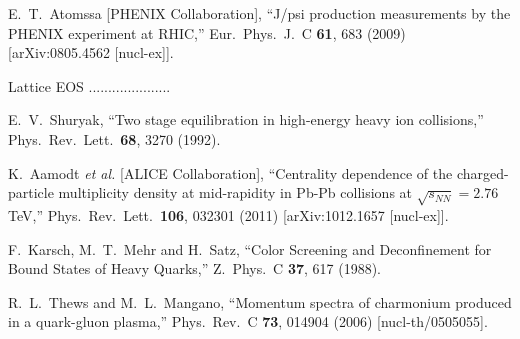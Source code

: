 \documentclass[aps,prc,preprint,superscriptaddress,showpacs,showkeys]{revtex4-1}
\begin{document}
\begin{thebibliography}{100}
  E.~T.~Atomssa [PHENIX Collaboration],
  ``J/psi production measurements by the PHENIX experiment at RHIC,''
  Eur.\ Phys.\ J.\ C {\bf 61}, 683 (2009)
  [arXiv:0805.4562 [nucl-ex]].

 Lattice EOS .....................


  E.~V.~Shuryak,
  ``Two stage equilibration in high-energy heavy ion collisions,''
  Phys.\ Rev.\ Lett.\  {\bf 68}, 3270 (1992).





  K.~Aamodt {\it et al.}  [ALICE Collaboration],
  ``Centrality dependence of the charged-particle multiplicity density at mid-rapidity in Pb-Pb collisions at $\sqrt{s_{NN}}=2.76$ TeV,''
  Phys.\ Rev.\ Lett.\  {\bf 106}, 032301 (2011)
  [arXiv:1012.1657 [nucl-ex]].


  F.~Karsch, M.~T.~Mehr and H.~Satz,
  ``Color Screening and Deconfinement for Bound States of Heavy Quarks,''
  Z.\ Phys.\ C {\bf 37}, 617 (1988).


  R.~L.~Thews and M.~L.~Mangano,
  ``Momentum spectra of charmonium produced in a quark-gluon plasma,''
  Phys.\ Rev.\ C {\bf 73}, 014904 (2006)
  [nucl-th/0505055].


\end{thebibliography}
\end{document}
